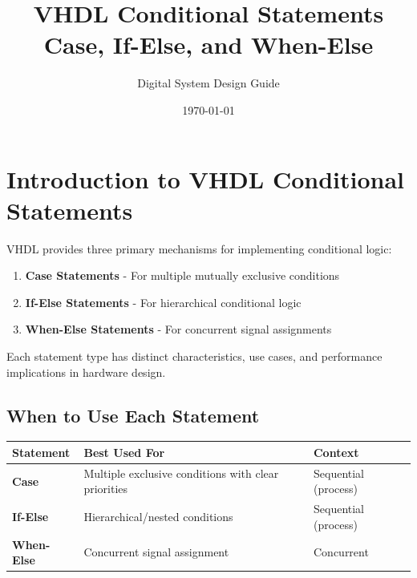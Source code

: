 \documentclass[12pt,a4paper]{article}
\title{\textbf{VHDL Conditional Statements}\\
        \normalsize Case, If-Else, and When-Else}
\author{Digital System Design Guide}
\date{\today}
\begin{document}
\maketitle
\tableofcontents
\newpage

\section{Introduction to VHDL Conditional Statements}

VHDL provides three primary mechanisms for implementing conditional logic:
\begin{enumerate}
    \item \textbf{Case Statements} - For multiple mutually exclusive conditions
    \item \textbf{If-Else Statements} - For hierarchical conditional logic
    \item \textbf{When-Else Statements} - For concurrent signal assignments
\end{enumerate}

Each statement type has distinct characteristics, use cases, and performance implications in hardware design.

\subsection{When to Use Each Statement}

\begin{table}[h]
\centering
\begin{tabular}{|l|p{4cm}|p{4cm}|}
\hline
\textbf{Statement} & \textbf{Best Used For} & \textbf{Context} \\
\hline
\textbf{Case} & Multiple exclusive conditions with clear priorities & Sequential (process) \\
\hline
\textbf{If-Else} & Hierarchical/nested conditions & Sequential (process) \\
\hline
\textbf{When-Else} & Concurrent signal assignment & Concurrent \\
\hline
\end{tabular}
\end{table}

\end{document}
